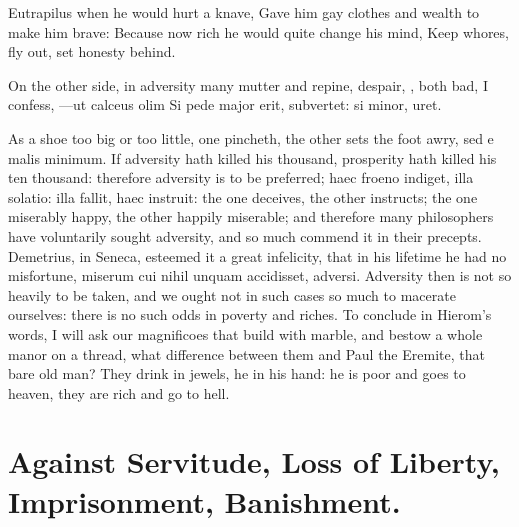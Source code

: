 {Eutrapilus when he would hurt a knave,
Gave him gay clothes and wealth to make him brave:
Because now rich he would quite change his mind,
Keep whores, fly out, set honesty behind.

On the other side, in adversity many mutter and repine, despair, \etc{},
both bad, I confess,
---ut calceus olim
Si pede major erit, subvertet: si minor, uret.

As a shoe too big or too little, one pincheth, the other sets the foot
awry, sed e malis minimum. If adversity hath killed his thousand,
prosperity hath killed his ten thousand: therefore adversity is to be
preferred; haec froeno indiget, illa solatio: illa fallit, haec
instruit: the one deceives, the other instructs; the one miserably
happy, the other happily miserable; and therefore many philosophers
have voluntarily sought adversity, and so much commend it in their
precepts. Demetrius, in Seneca, esteemed it a great infelicity, that in
his lifetime he had no misfortune, miserum cui nihil unquam accidisset,
adversi. Adversity then is not so heavily to be taken, and we ought not
in such cases so much to macerate ourselves: there is no such odds in
poverty and riches. To conclude in Hierom's words, I will ask our
magnificoes that build with marble, and bestow a whole manor on a
thread, what difference between them and Paul the Eremite, that bare
old man? They drink in jewels, he in his hand: he is poor and goes to
heaven, they are rich and go to hell.


\section{Against Servitude, Loss of Liberty, Imprisonment, Banishment.}

}
